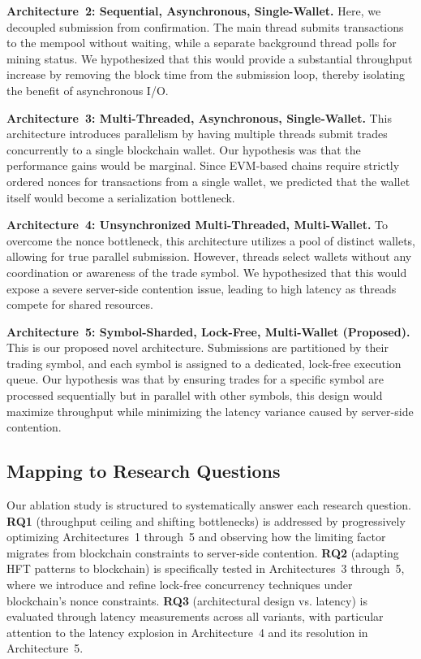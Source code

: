 \textbf{Architecture~2: Sequential, Asynchronous, Single-Wallet.}
Here, we decoupled submission from confirmation. The main thread submits transactions to the mempool without waiting, while a separate background thread polls for mining status. We hypothesized that this would provide a substantial throughput increase by removing the block time from the submission loop, thereby isolating the benefit of asynchronous I/O.

\textbf{Architecture~3: Multi-Threaded, Asynchronous, Single-Wallet.}
This architecture introduces parallelism by having multiple threads submit trades concurrently to a single blockchain wallet. Our hypothesis was that the performance gains would be marginal. Since EVM-based chains require strictly ordered nonces for transactions from a single wallet, we predicted that the wallet itself would become a serialization bottleneck.

\textbf{Architecture~4: Unsynchronized Multi-Threaded, Multi-Wallet.}
To overcome the nonce bottleneck, this architecture utilizes a pool of distinct wallets, allowing for true parallel submission. However, threads select wallets without any coordination or awareness of the trade symbol. We hypothesized that this would expose a severe server-side contention issue, leading to high latency as threads compete for shared resources.

\textbf{Architecture~5: Symbol-Sharded, Lock-Free, Multi-Wallet (Proposed).}
This is our proposed novel architecture. Submissions are partitioned by their trading symbol, and each symbol is assigned to a dedicated, lock-free execution queue. Our hypothesis was that by ensuring trades for a specific symbol are processed sequentially but in parallel with other symbols, this design would maximize throughput while minimizing the latency variance caused by server-side contention.

\subsection{Mapping to Research Questions}

Our ablation study is structured to systematically answer each research question. \textbf{RQ1} (throughput ceiling and shifting bottlenecks) is addressed by progressively optimizing Architectures~1 through~5 and observing how the limiting factor migrates from blockchain constraints to server-side contention. \textbf{RQ2} (adapting HFT patterns to blockchain) is specifically tested in Architectures~3 through~5, where we introduce and refine lock-free concurrency techniques under blockchain's nonce constraints. \textbf{RQ3} (architectural design vs. latency) is evaluated through latency measurements across all variants, with particular attention to the latency explosion in Architecture~4 and its resolution in Architecture~5.

